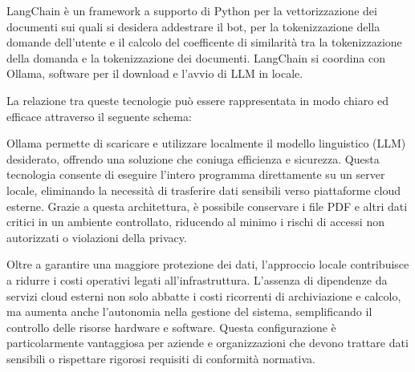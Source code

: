 \documentclass[a4paper,twoside,12pt]{toptesi}
\begin{document}
LangChain è un framework a supporto di Python per la vettorizzazione dei documenti sui quali si desidera addestrare il bot, per la tokenizzazione della domande dell'utente e il calcolo del coefficente di similarità tra la tokenizzazione della domanda e la tokenizzazione dei documenti. LangChain si coordina con Ollama, software per il download e l'avvio di LLM in locale.

La relazione tra queste tecnologie può essere rappresentata in modo chiaro ed efficace attraverso il seguente schema:
\begin{center}


\end{center}

Ollama permette di scaricare e utilizzare localmente il modello linguistico (LLM) desiderato, offrendo una soluzione che coniuga efficienza e sicurezza. Questa tecnologia consente di eseguire l'intero programma direttamente su un server locale, eliminando la necessità di trasferire dati sensibili verso piattaforme cloud esterne. Grazie a questa architettura, è possibile conservare i file PDF e altri dati critici in un ambiente controllato, riducendo al minimo i rischi di accessi non autorizzati o violazioni della privacy.

Oltre a garantire una maggiore protezione dei dati, l'approccio locale contribuisce a ridurre i costi operativi legati all'infrastruttura. L'assenza di dipendenze da servizi cloud esterni non solo abbatte i costi ricorrenti di archiviazione e calcolo, ma aumenta anche l'autonomia nella gestione del sistema, semplificando il controllo delle risorse hardware e software. Questa configurazione è particolarmente vantaggiosa per aziende e organizzazioni che devono trattare dati sensibili o rispettare rigorosi requisiti di conformità normativa.
\end{document}

